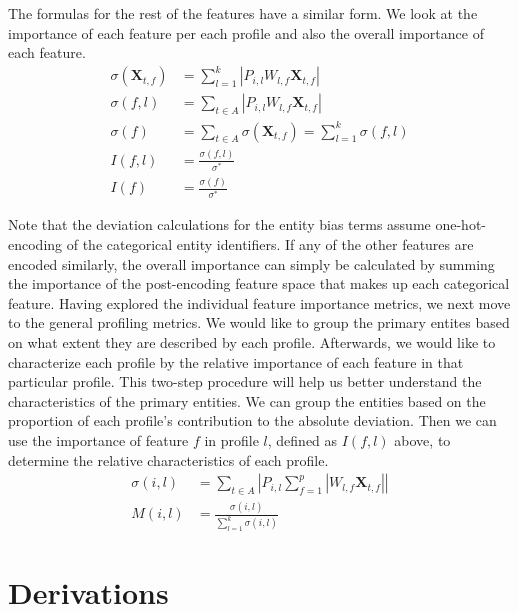 \documentclass[10pt]{proc}
\begin{document}
%
The formulas for the rest of the features have a similar form. We look at the
importance of each feature per each profile and also the overall importance of
each feature.
%
\begin{align}
    \sigma(\bm{X}_{t,f}) &= \sum_{l=1}^k | P_{i,l} W_{l,f} \bm{X}_{t,f} |  \\
    \sigma(f, l) &= \sum_{t \in A} | P_{i,l} W_{l,f} \bm{X}_{t,f} | \\
    \sigma(f) &= \sum_{t \in A} \sigma(\bm{X}_{t,f})
               = \sum_{l=1}^k \sigma(f, l)  \\
    I(f, l) &= \frac{\sigma(f, l)}{\sigma^*}  \\
    I(f) &= \frac{\sigma(f)}{\sigma^*}
\end{align}

Note that the deviation calculations for the entity bias terms assume
one-hot-encoding of the categorical entity identifiers. If any of the other
features are encoded similarly, the overall importance can simply be calculated
by summing the importance of the post-encoding feature space that makes up each
categorical feature. Having explored the individual feature importance metrics,
we next move to the general profiling metrics. We would like to group the
primary entites based on what extent they are described by each profile.
Afterwards, we would like to characterize each profile by the relative
importance of each feature in that particular profile. This two-step procedure
will help us better understand the characteristics of the primary entities. We
can group the entities based on the proportion of each profile's contribution to
the absolute deviation. Then we can use the importance of feature $f$ in
profile $l$, defined as $I(f, l)$ above, to determine the relative
characteristics of each profile.
%
\begin{align}
    \sigma(i, l) &= \sum_{t \in A} \left|
        P_{i,l} \sum_{f=1}^p | W_{l,f} \bm{X}_{t,f} |
    \right|  \\
    M(i, l) &= \frac{\sigma(i, l)}{\sum_{l=1}^k \sigma(i, l)}
\end{align}


\section{Derivations}\label{derivations}

\setlength{\belowdisplayskip}{6pt} \setlength{\belowdisplayshortskip}{6pt}
\setlength{\abovedisplayskip}{8pt} \setlength{\abovedisplayshortskip}{8pt}
\end{document}
